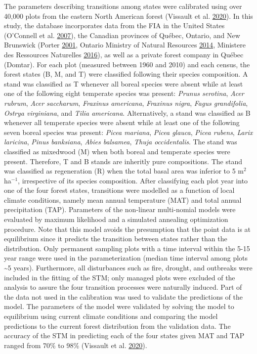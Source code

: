 \documentclass[12pt]{article}
\begin{document}
The parameters describing transitions among states were calibrated using
over 40,000 plots from the eastern North American forest (Vissault et
al. \protect\hyperlink{ref-Vissault2020}{2020}). In this study, the
database incorporates data from the FIA in the United States (O'Connell
et al. \protect\hyperlink{ref-OConnell2007}{2007}), the Canadian
provinces of Québec, Ontario, and New Brunswick (Porter
\protect\hyperlink{ref-Porter2001}{2001}, Ontario Ministry of Natural
Resources \protect\hyperlink{ref-OMNR2014}{2014}, Ministere des
Ressources Naturelles \protect\hyperlink{ref-Naturelles2016}{2016}), as
well as a private forest company in Québec (Domtar). For each plot
(measured between 1960 and 2010) and each census, the forest states (B,
M, and T) were classified following their species composition. A stand
was classified as T whenever all boreal species were absent while at
least one of the following eight temperate species was present:
\emph{Prunus serotina}, \emph{Acer rubrum}, \emph{Acer saccharum},
\emph{Fraxinus americana}, \emph{Fraxinus nigra}, \emph{Fagus
grandifolia}, \emph{Ostrya virginiana}, and \emph{Tilia americana}.
Alternatively, a stand was classified as B whenever all temperate
species were absent while at least one of the following seven boreal
species was present: \emph{Picea mariana}, \emph{Picea glauca},
\emph{Picea rubens}, \emph{Larix laricina}, \emph{Pinus banksiana},
\emph{Abies balsamea}, \emph{Thuja occidentalis}. The stand was
classified as mixedwood (M) when both boreal and temperate species were
present. Therefore, T and B stands are inheritly pure compositions. The
stand was classified as regeneration (R) when the total basal area was
inferior to 5 m\(^2\) ha\(^{-1}\), irrespective of its species
composition. After classifying each plot year into one of the four
forest states, transitions were modelled as a function of local climate
conditions, namely mean annual temperature (MAT) and total annual
precipitation (TAP). Parameters of the non-linear multi-nomial models
were evaluated by maximum likelihood and a simulated annealing
optimization procedure. Note that this model avoids the presumption that
the point data is at equilibrium since it predicts the transition
between states rather than the distribution. Only permanent sampling
plots with a time interval within the 5-15 year range were used in the
parameterization (median time interval among plots \textasciitilde5
years). Furthermore, all disturbances such as fire, drought, and
outbreaks were included in the fitting of the STM; only managed plots
were excluded of the analysis to assure the four transition processes
were naturally induced. Part of the data not used in the calibration was
used to validate the predictions of the model. The parameters of the
model were validated by solving the model to equilibrium using current
climate conditions and comparing the model predictions to the current
forest distribution from the validation data. The accuracy of the STM in
predicting each of the four states given MAT and TAP ranged from 70\% to
98\% (Vissault et al. \protect\hyperlink{ref-Vissault2020}{2020}).
\end{document}
